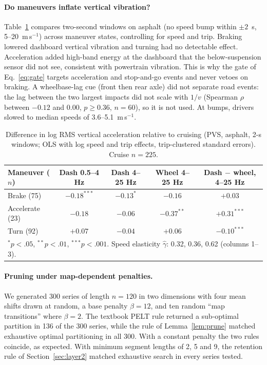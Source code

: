 \paragraph{Do maneuvers inflate vertical vibration?}
Table~\ref{tab:maneuver} compares two-second windows on asphalt (no speed bump within $\pm2$~s, 5--20~m\,s$^{-1}$) across maneuver states, controlling for speed and trip.
Braking lowered dashboard vertical vibration and turning had no detectable effect.
Acceleration added high-band energy at the dashboard that the below-suspension sensor did not see, consistent with powertrain vibration.
This is why the gate of Eq.~\eqref{eq:gate} targets acceleration and stop-and-go events and never vetoes on braking.
A wheelbase-lag cue (front then rear axle) did not separate road events: the lag between the two largest impacts did not scale with $1/v$ (Spearman $\rho$ between $-0.12$ and $0.00$, $p\ge0.36$, $n=60$), so it is not used.
At bumps, drivers slowed to median speeds of 3.6--5.1~m\,s$^{-1}$.

\begin{table}[t]
\caption{Difference in log RMS vertical acceleration relative to cruising (PVS, asphalt, 2-s windows; OLS with log speed and trip effects, trip-clustered standard errors). Cruise $n=225$.}
\label{tab:maneuver}
\begin{tabular}{lcccc}
\toprule
Maneuver ($n$) & Dash 0.5--4 Hz & Dash 4--25 Hz & Wheel 4--25 Hz & Dash $-$ wheel, 4--25 Hz\\
\midrule
Brake (75) & $-0.18^{***}$ & $-0.13^{*}$ & $-0.16$ & $+0.03$\\
Accelerate (23) & $-0.18$ & $-0.06$ & $-0.37^{**}$ & $+0.31^{***}$\\
Turn (92) & $+0.07$ & $-0.04$ & $+0.06$ & $-0.10^{***}$\\
\bottomrule
\multicolumn{5}{l}{\footnotesize $^{*}p<.05$, $^{**}p<.01$, $^{***}p<.001$. Speed elasticity $\hat\gamma$: 0.32, 0.36, 0.62 (columns 1--3).}
\end{tabular}
\end{table}

\paragraph{Pruning under map-dependent penalties.}
We generated 300 series of length $n=120$ in two dimensions with four mean shifts drawn at random, a base penalty $\beta=12$, and ten random ``map transitions'' where $\beta=2$.
The textbook PELT rule returned a sub-optimal partition in 136 of the 300 series, while the rule of Lemma~\ref{lem:prune} matched exhaustive optimal partitioning in all 300.
With a constant penalty the two rules coincide, as expected.
With minimum segment lengths of 2, 5 and 9, the retention rule of Section~\ref{sec:layer2} matched exhaustive search in every series tested.

